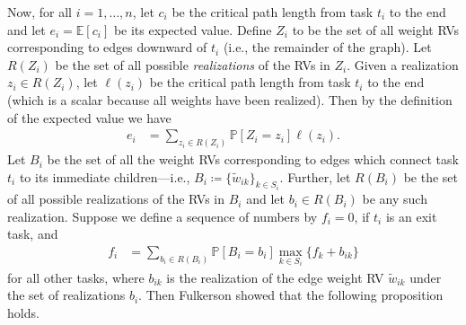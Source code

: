 \documentclass[12pt]{article}
\def\P{\mathbb{P}}
\def\E{\mathbb{E}}
\begin{document}
Now, for all $i = 1, \dots, n$, let $c_i$ be the critical path length from task $t_i$ to the end and let $e_i = \E[c_i]$ be its expected value. Define $Z_i$ to be the set of all weight RVs corresponding to edges downward of $t_i$ (i.e., the remainder of the graph). Let $R(Z_i)$ be the set of all possible {\em realizations} of the RVs in $Z_i$. Given a realization $z_i \in R(Z_i)$, let $\ell(z_i)$ be the critical path length from task $t_i$ to the end (which is a scalar because all weights have been realized). Then by the definition of the expected value we have
\begin{align}
e_i &= \sum_{z_i \in R(Z_i)} \P[Z_i = z_i] \ell(z_i). \label{eq.ei}
\end{align}
Let $B_i$ be the set of all the weight RVs corresponding to edges which connect task $t_i$ to its immediate children---i.e., $B_i \coloneqq \{ \tilde{w}_{ik} \}_{k \in S_i}$. Further, let $R(B_i)$ be the set of all possible realizations of the RVs in $B_i$ and let $b_i \in R(B_i)$ be any such realization. Suppose we define a sequence of numbers by $f_i = 0$, if $t_i$ is an exit task, and
\begin{align}
f_i &= \sum_{b_i \in R(B_i)} \P[B_i = b_i] \max_{k \in S_i} \{ f_k + b_{ik} \} \label{eq.f_fulkerson}
\end{align}
for all other tasks, where $b_{ik}$ is the realization of the edge weight RV $\tilde{w}_{ik}$ under the set of realizations $b_i$. Then Fulkerson showed that the following proposition holds. 
\end{document}
